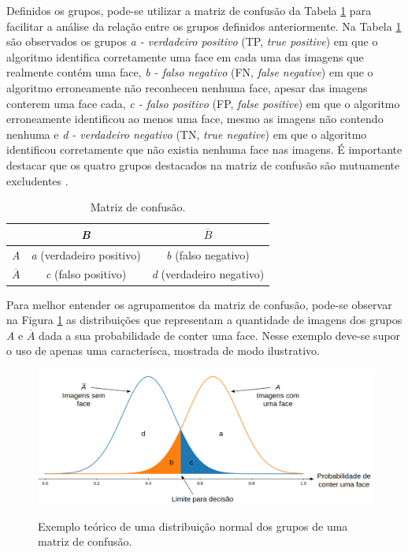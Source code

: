 Definidos os grupos, pode-se utilizar a matriz de confusão da Tabela \ref{tab:matriz_de_confusao} para facilitar a análise da relação entre os grupos definidos anteriormente. Na Tabela \ref{tab:matriz_de_confusao} são observados os grupos \textit{a - verdadeiro positivo} (TP, \textit{true positive}) em que o algoritmo identifica corretamente uma face em cada uma das imagens que realmente contém uma face, \textit{b - falso negativo} (FN, \textit{false negative}) em que o algoritmo erroneamente não reconheceu nenhuma face, apesar das imagens conterem uma face cada, \textit{c - falso positivo} (FP, \textit{false positive}) em que o algoritmo erroneamente identificou ao menos uma face, mesmo as imagens não contendo nenhuma e \textit{d - verdadeiro negativo} (TN, \textit{true negative}) em que o algoritmo identificou corretamente que não existia nenhuma face nas imagens. É importante destacar que os quatro grupos destacados na matriz de confusão são mutuamente excludentes \cite{Dougherty:2012:PRC:2553126}.

\begin{table}[htbp]
    \caption{Matriz de confusão.}
    \label{tab:matriz_de_confusao}
    \centering
    \renewcommand{\arraystretch}{1.4}
    \begin{tabular}{c|cc}
        \hline\hline
                       & \textit{B}                       & $\overline{B}$                   \\
        \hline
        \textit{A}     & \textit{a} (verdadeiro positivo) & \textit{b} (falso negativo)      \\
        $\overline{A}$ & \textit{c} (falso positivo)      & \textit{d} (verdadeiro negativo) \\
        \hline\hline
    \end{tabular}
\end{table}

Para melhor entender os agrupamentos da matriz de confusão, pode-se observar na Figura \ref{fig:norm_dist} as distribuições que representam a quantidade de imagens dos grupos \textit{A} e $\overline{A}$ dada a sua probabilidade de conter uma face. Nesse exemplo deve-se supor o uso de apenas uma caracterísca, mostrada de modo ilustrativo.

\begin{figure}[htb]
    \centering
    \caption{Exemplo teórico de uma distribuição normal dos grupos de uma matriz de confusão.}
    \includegraphics[scale=.4]{figs/norm_dist.png}
    \label{fig:norm_dist}
\end{figure}

